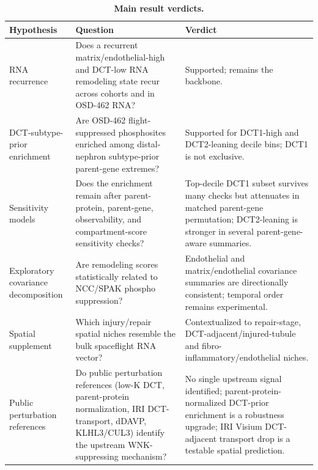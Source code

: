 \documentclass[10pt]{article}
\begin{document}
\begin{table}[H]
\centering\small
\caption{\textbf{Main result verdicts.}}
\label{tab:verdicts}
\begin{tabularx}{\textwidth}{p{}Xp{}}
\toprule
Hypothesis & Question & Verdict \\
\midrule
RNA recurrence & Does a recurrent matrix/endothelial-high and DCT-low RNA remodeling state recur across cohorts and in OSD-462 RNA? & Supported; remains the backbone. \\
DCT-subtype-prior enrichment & Are OSD-462 flight-suppressed phosphosites enriched among distal-nephron subtype-prior parent-gene extremes? & Supported for DCT1-high and DCT2-leaning decile bins; DCT1 is not exclusive. \\
Sensitivity models & Does the enrichment remain after parent-protein, parent-gene, observability, and compartment-score sensitivity checks? & Top-decile DCT1 subset survives many checks but attenuates in matched parent-gene permutation; DCT2-leaning is stronger in several parent-gene-aware summaries. \\
Exploratory covariance decomposition & Are remodeling scores statistically related to NCC/SPAK phospho suppression? & Endothelial and matrix/endothelial covariance summaries are directionally consistent; temporal order remains experimental. \\
Spatial supplement & Which injury/repair spatial niches resemble the bulk spaceflight RNA vector? & Contextualized to repair-stage, DCT-adjacent/injured-tubule and fibro-inflammatory/endothelial niches. \\
Public perturbation references & Do public perturbation references (low-K DCT, parent-protein normalization, IRI DCT-transport, dDAVP, KLHL3/CUL3) identify the upstream WNK-suppressing mechanism? & No single upstream signal identified; parent-protein-normalized DCT-prior enrichment is a robustness upgrade; IRI Visium DCT-adjacent transport drop is a testable spatial prediction. \\
\bottomrule
\end{tabularx}
\end{table}
\end{document}
